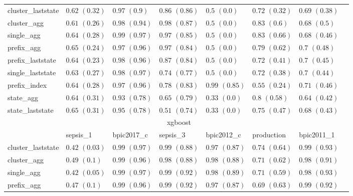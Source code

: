\documentclass[twoside,11pt]{Latex/Classes/PhDthesisPSnPDF}
\begin{document}
\begin{table}[h]
{\begin{tabular}{llllllll}
				cluster\_laststate & $0.62$ ${(0.32)}$ & $0.97$ ${(0.9)}$ & $0.86$ ${(0.86)}$ & $0.5$ ${(0.0)}$ & $0.72$ ${(0.32)}$ & $0.69$ ${(0.38)}$ \\
				cluster\_agg & $0.61$ ${(0.26)}$ & $0.98$ ${(0.94)}$ & $0.98$ ${(0.87)}$ & $0.5$ ${(0.0)}$ & $0.83$ ${(0.6)}$ & $0.68$ ${(0.5)}$ \\
				single\_agg & $0.64$ ${(0.28)}$ & $0.99$ ${(0.97)}$ & $0.97$ ${(0.85)}$ & $0.5$ ${(0.0)}$ & $0.83$ ${(0.66)}$ & $0.68$ ${(0.46)}$ \\
				prefix\_agg & $0.65$ ${(0.24)}$ & $0.97$ ${(0.96)}$ & $0.97$ ${(0.84)}$ & $0.5$ ${(0.0)}$ & $0.79$ ${(0.62)}$ & $0.7$ ${(0.48)}$ \\
				prefix\_laststate & $0.64$ ${(0.23)}$ & $0.98$ ${(0.96)}$ & $0.87$ ${(0.84)}$ & $0.5$ ${(0.0)}$ & $0.72$ ${(0.41)}$ & $0.7$ ${(0.45)}$ \\
				single\_laststate & $0.63$ ${(0.27)}$ & $\mathbf{0.98}$ $\mathbf{(0.97)}$  & $0.74$ ${(0.77)}$ & $0.5$ ${(0.0)}$ & $0.72$ ${(0.38)}$ & $0.7$ ${(0.44)}$ \\
				prefix\_index & $0.64$ ${(0.28)}$ & $0.97$ ${(0.96)}$ & $0.78$ ${(0.83)}$ & $0.99$ ${(0.85)}$ & $0.55$ ${(0.24)}$ & $0.71$ ${(0.46)}$ \\
				state\_agg & $0.64$ ${(0.31)}$ & $0.93$ ${(0.78)}$ & $0.65$ ${(0.79)}$ & $0.33$ ${(0.0)}$ & $0.8$ ${(0.58)}$ & $0.64$ ${(0.42)}$ \\
				state\_laststate & $0.65$ ${(0.31)}$ & $0.95$ ${(0.78)}$ & $0.51$ ${(0.74)}$ & $0.33$ ${(0.0)}$ & $0.75$ ${(0.47)}$ & $0.68$ ${(0.43)}$ \\
				\bottomrule
				\toprule
				& \multicolumn{5}{c}{xgboost}
				\\
				& sepsis\_1 & bpic2017\_c & sepsis\_3 & bpic2012\_c & production & bpic2011\_1
				\\ \midrule
				cluster\_laststate & $0.42$ ${(0.03)}$ & $\mathbf{0.99}$ $\mathbf{(0.97)}$  & $0.99$ ${(0.88)}$ & $0.97$ ${(0.87)}$ & $0.74$ ${(0.64)}$ & $0.99$ ${(0.93)}$ \\
				cluster\_agg & $0.49$ ${(0.1)}$ & $\mathbf{0.99}$ $\mathbf{(0.96)}$  & $0.98$ ${(0.88)}$ & $\mathbf{0.98}$ $\mathbf{(0.88)}$  & $0.71$ ${(0.62)}$ & $\mathbf{0.98}$ $\mathbf{(0.91)}$  \\
				single\_agg & $0.42$ ${(0.05)}$ & $\mathbf{0.99}$ $\mathbf{(0.97)}$  & $0.99$ ${(0.92)}$ & $\mathbf{0.98}$ $\mathbf{(0.89)}$  & $0.71$ ${(0.59)}$ & $\mathbf{0.98}$ $\mathbf{(0.93)}$  \\
				prefix\_agg & $0.47$ ${(0.1)}$ & $\mathbf{0.99}$ $\mathbf{(0.96)}$  & $0.99$ ${(0.92)}$ & $0.97$ ${(0.87)}$ & $0.69$ ${(0.63)}$ & $0.99$ ${(0.92)}$ \\

\end{tabular}}
\end{table}
\end{document}
